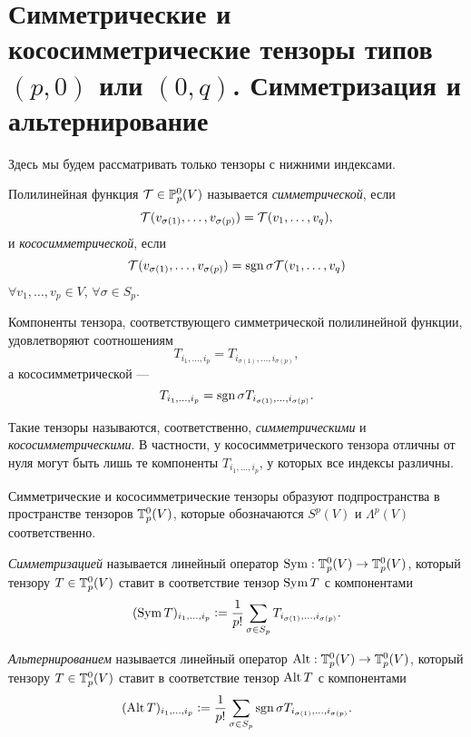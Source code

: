 \section{Симметрические и кососимметрические тензоры типов $(p, 0)$ или $(0, q)$. Симметризация и альтернирование}

Здесь мы будем рассматривать только тензоры с нижними индексами.

\begin{definition}
    Полилинейная функция $\mathcal{T} \in \mathbb{P}_p^0(V)$ называется \textit{симметрической}, если
    \[
        \mathcal{T}(v_{\sigma(1)}, \ldots, v_{\sigma(p)}) = \mathcal{T}(v_1, \ldots, v_q),
    \]
    и \textit{кососимметрической}, если
    \[
        \mathcal{T}(v_{\sigma(1)}, \ldots, v_{\sigma(p)}) = \operatorname{sgn}\sigma\mathcal{T}(v_1, \ldots, v_q)
    \]
    $\forall v_1, \ldots, v_p \in V$, $\forall \sigma \in S_p$.
\end{definition}

Компоненты тензора, соответствующего симметрической полилинейной функции, удовлетворяют соотношениям
\[
    T_{i_1, \ldots, i_p} = T_{i_{\sigma(1)}, \ldots, i_{\sigma(p)}},
\]
а кососимметрической ---
\[
    T_{i_1, \ldots, i_p} = \operatorname{sgn}\sigma T_{i_{\sigma(1)}, \ldots, i_{\sigma(p)}}.
\]

Такие тензоры называются, соответственно, \textit{симметрическими} и \textit{кососимметрическими}. В частности, у кососимметрического тензора отличны от нуля могут быть лишь те компоненты $T_{i_1, \ldots, i_p}$, у которых все индексы различны.

Симметрические и кососимметрические тензоры образуют подпространства в пространстве тензоров $\mathbb{T}_p^0(V)$, которые обозначаются $S^p(V)$ и $\Lambda^p(V)$ соответственно.

\begin{definition}
    \textit{Симметризацией} называется линейный оператор $\operatorname{Sym}: \mathbb{T}_p^0(V) \to \mathbb{T}_p^0(V)$, который тензору $T \in \mathbb{T}_p^0(V)$ ставит в соответствие тензор $\operatorname{Sym} T$ с компонентами
    \[
        (\operatorname{Sym} T)_{i_1, \ldots, i_p} \vcentcolon = \frac{1}{p!}\sum_{\sigma \in S_p}T_{i_{\sigma(1)}, \ldots, i_{\sigma(p)}}.
    \]
\end{definition}

\begin{definition}
    \textit{Альтернированием} называется линейный оператор $\operatorname{Alt}: \mathbb{T}_p^0(V) \to \mathbb{T}_p^0(V)$, который тензору $T \in \mathbb{T}_p^0(V)$ ставит в соответствие тензор $\operatorname{Alt} T$ с компонентами
    \[
        (\operatorname{Alt} T)_{i_1, \ldots, i_p} \vcentcolon = \frac{1}{p!}\sum_{\sigma \in S_p}\operatorname{sgn}\sigma T_{i_{\sigma(1)}, \ldots, i_{\sigma(p)}}.
    \]
\end{definition}

